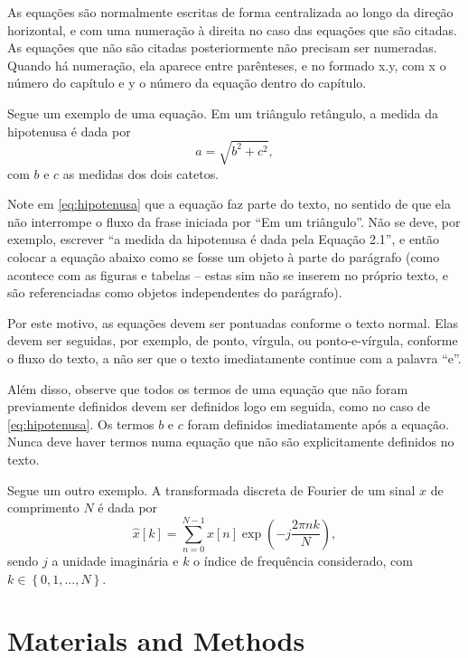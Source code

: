 \documentclass[a4paper, 12pt]{ppgeb}
\begin{document}
As equações são normalmente escritas de forma centralizada ao longo da direção horizontal, e com uma numeração à direita no caso das equações que são citadas. As equações que não são citadas posteriormente não precisam ser numeradas. Quando há numeração, ela aparece entre parênteses, e no formado x.y, com x o número do capítulo e y o número da equação dentro do capítulo.

Segue um exemplo de uma equação. Em um triângulo retângulo, a medida da hipotenusa é dada por
\begin{equation}\label{eq:hipotenusa}
a = \sqrt{b^2 + c^2},
\end{equation}
com ${b}$ e ${c}$ as medidas dos dois catetos.

Note em \eqref{eq:hipotenusa} que a equação faz parte do texto, no sentido de que ela não interrompe o fluxo da frase iniciada por ``Em um triângulo''. Não se deve, por exemplo, escrever ``a medida da hipotenusa é dada pela Equação 2.1'', e então colocar a equação abaixo como se fosse um objeto à parte do parágrafo (como acontece com as figuras e tabelas -- estas sim não se inserem no próprio texto, e são referenciadas como objetos independentes do parágrafo).

Por este motivo, as equações devem ser pontuadas conforme o texto normal. Elas devem ser seguidas, por exemplo, de ponto, vírgula, ou ponto-e-vírgula, conforme o fluxo do texto, a não ser que o texto imediatamente continue com a palavra ``e''.

Além disso, observe que todos os termos de uma equação que não foram previamente definidos devem ser definidos logo em seguida, como no caso de \eqref{eq:hipotenusa}. Os termos ${b}$ e ${c}$ foram definidos imediatamente após a equação. Nunca deve haver termos numa equação que não são explicitamente definidos no texto.

Segue um outro exemplo. A transformada discreta de Fourier de um sinal ${x}$ de comprimento ${N}$ é dada por
\begin{equation}
\hat{x}[k]=\sum_{n=0}^{N-1}x[n]\exp\left(-j\frac{2\pi nk}{N}\right),
\end{equation}
sendo ${j}$ a unidade imaginária e ${k}$ o índice de frequência considerado, com ${k\in\left\{0,1,\ldots,N\right\}}$.

\chapter{Materials and Methods}\label{chap:Metodologia}
\end{document}
